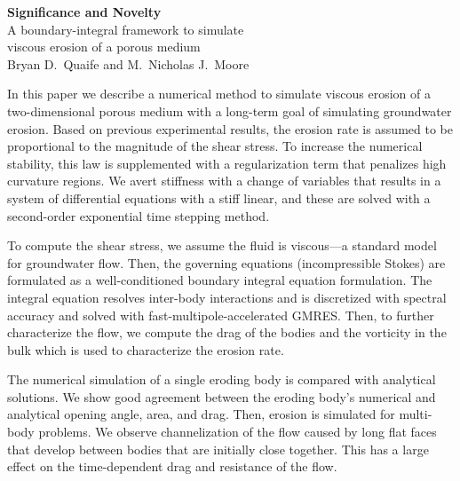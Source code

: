 \documentclass[11pt]{article}
\begin{document}
\begin{center}
  {\bf Significance and Novelty} \\
  A boundary-integral framework to simulate \\ viscous erosion of a
  porous medium \\
  Bryan D.~Quaife and M.~Nicholas J.~Moore
\end{center}
In this paper we describe a numerical method to simulate viscous erosion
of a two-dimensional porous medium with a long-term goal of simulating
groundwater erosion.  Based on previous experimental results, the
erosion rate is assumed to be proportional to the magnitude of the shear
stress.  To increase the numerical stability, this law is supplemented
with a regularization term that penalizes high curvature regions.  We
avert stiffness with a change of variables that results in a system of
differential equations with a stiff linear, and these are solved with a
second-order exponential time stepping method.  

To compute the shear stress, we assume the fluid is viscous---a
standard model for groundwater flow.  Then, the governing equations
(incompressible Stokes) are formulated as a well-conditioned boundary
integral equation formulation.  The integral equation resolves
inter-body interactions and is discretized with spectral accuracy and
solved with fast-multipole-accelerated GMRES.  Then, to further
characterize the flow, we compute the drag of the bodies and the
vorticity in the bulk which is used to characterize the erosion rate.

The numerical simulation of a single eroding body is compared with
analytical solutions.  We show good agreement between the eroding body's
numerical and analytical opening angle, area, and drag.  Then, erosion
is simulated for multi-body problems. We observe channelization of the
flow caused by long flat faces that develop between bodies that are
initially close together.  This has a large effect on the time-dependent
drag and resistance of the flow.
\end{document}
